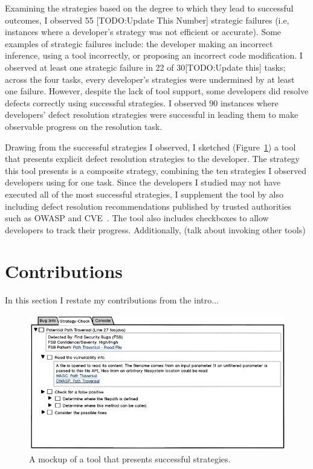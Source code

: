 \documentclass{sig-alternate}
\begin{document}
Examining the strategies based on the degree to which they lead to successful outcomes, I observed 55 [TODO:Update This Number] strategic failures (i.e, instances where a developer's strategy was not efficient or accurate). Some examples of strategic failures include: the developer making an incorrect inference, using a tool incorrectly, or proposing an incorrect code modification.
I observed at least one strategic failure in 22 of 30[TODO:Update this] tasks; across the four tasks, every developer's strategies were undermined by at least one failure.
However, despite the lack of tool support, some developers did resolve defects correctly using successful strategies. I observed 90 instances where developers' defect resolution strategies were successful in leading them to make observable progress on the resolution task.

Drawing from the successful strategies I observed, I sketched (Figure~\ref{fig:tool}) a tool that presents explicit defect resolution strategies to the developer. 
The strategy this tool presents is a composite strategy, combining the ten strategies I observed developers using for one task.
Since the developers I studied may not have executed all of the most successful strategies, I supplement the tool by also including defect resolution recommendations published by trusted authorities such as OWASP and CVE~\cite{OWASP, CVE}.
The tool also includes checkboxes to allow developers to track their progress.
Additionally, (talk about invoking other tools)

\section{Contributions}


In this section I restate my contributions from the intro...



\begin{figure}
	\centering
	\includegraphics[width=\columnwidth]{images/toolscreenshot}
	\caption{A mockup of a tool that presents successful strategies.}
	\label{fig:tool} 
\end{figure}





%


\end{document}
